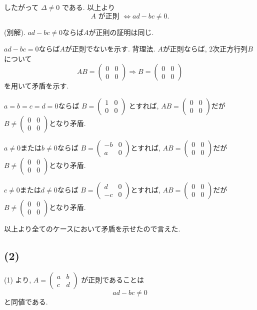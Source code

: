 \documentclass[uplatex,dvipdfmx,a4paper,14pt]{jsarticle}
\begin{document}
したがって $\Delta\ne0$ である. 以上より
\[
\boxed{A\text{ が正則 }\Longleftrightarrow ad-bc\ne0.}
\]

(別解). 
$ad-bc\neq0$ならば$A$が正則の証明は同じ. 

$ad-bc=0$ならば$A$が正則でないを示す. 
背理法. $A$が正則ならば, 2次正方行列$B$について
$$
AB=
\begin{pmatrix}0&0\\0&0\end{pmatrix}
\Rightarrow B=
\begin{pmatrix}0&0\\0&0\end{pmatrix}
$$
を用いて矛盾を示す.

$a=b=c=d=0$ならば
$
B=\begin{pmatrix}1&0\\0&0\end{pmatrix}
$
とすれば, $AB=\begin{pmatrix}0&0\\0&0\end{pmatrix}$だが$B \neq\begin{pmatrix}0&0\\0&0\end{pmatrix}$となり矛盾.

$a\neq0$または$b\neq0$ならば
$
B=\begin{pmatrix}-b&0\\a&0\end{pmatrix}
$とすれば, $AB=\begin{pmatrix}0&0\\0&0\end{pmatrix}$だが$B \neq\begin{pmatrix}0&0\\0&0\end{pmatrix}$となり矛盾.

$c\neq0$または$d\neq0$ならば
$
B=\begin{pmatrix}d&0\\-c&0\end{pmatrix}
$とすれば, $AB=\begin{pmatrix}0&0\\0&0\end{pmatrix}$だが$B \neq\begin{pmatrix}0&0\\0&0\end{pmatrix}$となり矛盾.
 
以上より全てのケースにおいて矛盾を示せたので言えた. 

\subsection*{(2)}
(1) より, $A=\begin{pmatrix}a&b\\c&d\end{pmatrix}$ が正則であることは
\[
ad-bc\ne0
\]
と同値である.
\end{document}
